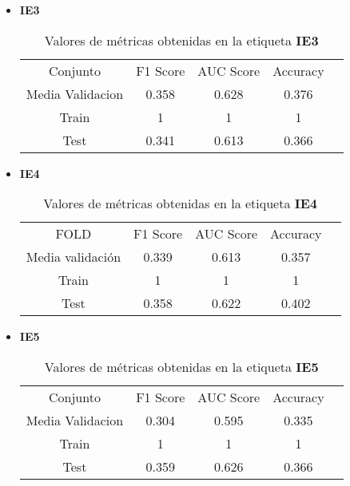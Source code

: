 \begin{itemize}
	\item  \textbf{IE3}
	      \begin{table}[H]
		      \centering
		      \begin{tabular}{|c|c|c|c|c}
			      \cline{1-4}
			      Conjunto         & F1 Score & AUC Score & Accuracy \\ \cline{1-4}
			      Media Validacion & 0.358    & 0.628     & 0.376    \\ \cline{1-4}
			      Train            & 1        & 1         & 1        \\ \cline{1-4}
			      Test             & 0.341    & 0.613     & 0.366    \\ \cline{1-4}
		      \end{tabular}
		      \caption{Valores de métricas obtenidas en la etiqueta \textbf{IE3}}
	      \end{table}
	\item  \textbf{IE4}
	      \begin{table}[H]
		      \centering
		      \begin{tabular}{|c|c|c|c|c}
			      \cline{1-4}
			      FOLD             & F1 Score & AUC Score & Accuracy \\ \cline{1-4}
			      Media validación & 0.339    & 0.613     & 0.357    \\ \cline{1-4}
			      Train            & 1        & 1         & 1        \\ \cline{1-4}
			      Test             & 0.358    & 0.622     & 0.402    \\ \cline{1-4}
		      \end{tabular}
		      \caption{Valores de métricas obtenidas en la etiqueta \textbf{IE4}}
	      \end{table}
	\item  \textbf{IE5}
	      \begin{table}[H]
		      \centering
		      \begin{tabular}{|c|c|c|c|c}
			      \cline{1-4}
			      Conjunto         & F1 Score & AUC Score & Accuracy \\ \cline{1-4}
			      Media Validacion & 0.304    & 0.595     & 0.335    \\ \cline{1-4}
			      Train            & 1        & 1         & 1        \\ \cline{1-4}
			      Test             & 0.359    & 0.626     & 0.366    \\ \cline{1-4}
		      \end{tabular}
		      \caption{Valores de métricas obtenidas en la etiqueta \textbf{IE5}}

\end{table}
\end{itemize}
